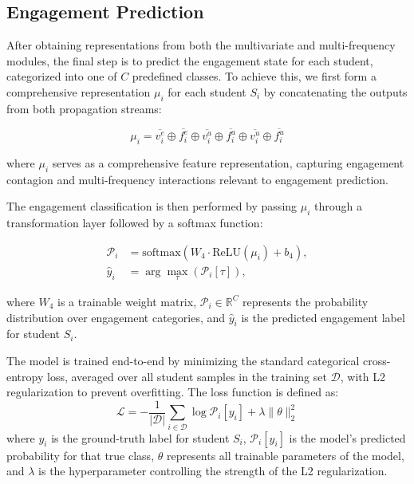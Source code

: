 \documentclass[runningheads]{llncs}
\begin{document}
\subsection{Engagement Prediction}{\label{Engagement Prediction}}
After obtaining representations from both the multivariate and multi-frequency modules, the final step is to predict the engagement state for each student, categorized into one of $C$ predefined classes. To achieve this, we first form a comprehensive representation $\mu_i$ for each student $S_i$ by concatenating the outputs from both propagation streams:

\begin{equation}\label{eq:e17}
	\mu_i = \overline{v_{i}^e} \oplus \overline{f_{i}^e} \oplus \overline{v_{i}^a} \oplus \overline{f_{i}^a} \oplus \overline{v_{i}^u} \oplus 
	\overline{f_{i}^u} 
\end{equation}


\noindent where $\mu_i$ serves as a comprehensive feature representation, capturing engagement contagion and multi-frequency interactions relevant to engagement prediction.

The engagement classification is then performed by passing $\mu_i$ through a transformation layer followed by a softmax function:

\begin{equation}\label{eq:e18} 
	\begin{aligned}
		\mathcal{P}_i &= \text{softmax}(W_4 \cdot \text{ReLU}(\mu_i) + b_4), \\
		\hat{y}_i &= \arg\max_{\tau}(\mathcal{P}_i[\tau]),
	\end{aligned}
\end{equation}

\noindent where $W_4$ is a trainable weight matrix, $\mathcal{P}_i \in \mathbb{R}^C$ represents the probability distribution over engagement categories, and $\hat{y}_i$ is the predicted engagement label for student $S_i$.

The model is trained end-to-end by minimizing the standard categorical cross-entropy loss, averaged over all student samples in the training set $\mathcal{D}$, with L2 regularization to prevent overfitting. The loss function is defined as:
\begin{equation}\label{eq:e19}
	\mathcal{L} = - \frac{1}{|\mathcal{D}|} \sum_{i \in \mathcal{D}} \log \mathcal{P}_{i}[y_{i}] + \lambda \|\theta\|_2^2
\end{equation}
\noindent where $y_i$ is the ground-truth label for student $S_i$, $\mathcal{P}_{i}[y_{i}]$ is the model's predicted probability for that true class, $\theta$ represents all trainable parameters of the model, and $\lambda$ is the hyperparameter controlling the strength of the L2 regularization.
\end{document}
